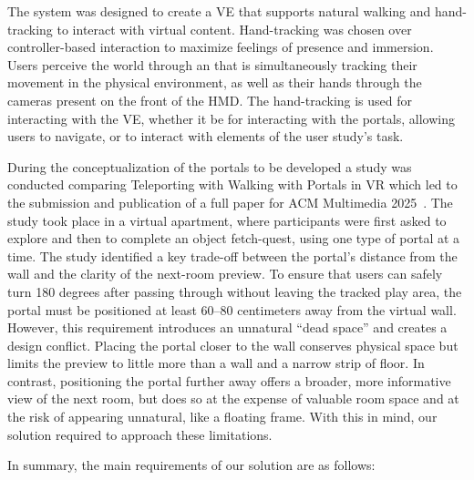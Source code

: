 The system was designed to create a \gls{VE} that supports natural walking and hand-tracking to interact with virtual content. 
Hand-tracking was chosen over controller-based interaction to maximize feelings of presence and immersion. Users 
perceive the world through an  that is simultaneously tracking their movement in the physical environment, as well as their hands 
through the cameras present on the front of the \gls{HMD}. The hand-tracking is used for interacting with the \gls{VE}, whether it be for interacting with the 
portals, allowing users to navigate, or to interact with elements of the user study's task.

During the conceptualization of the portals to be developed a study was conducted comparing Teleporting with Walking with Portals in 
\gls{VR} which led to the submission and publication of a full paper for ACM Multimedia 2025~\cite{RebeloACMM2025}.
The study took place in a virtual apartment, where participants were first asked to explore and then to complete an object fetch-quest, 
using one type of portal at a time. The study identified a key trade-off between the portal's distance from the wall and the clarity of the 
next-room preview. To ensure that users can safely turn 180 degrees after passing through without leaving the tracked play area, the portal 
must be positioned at least 60–80 centimeters away from the virtual wall. However, this requirement introduces an unnatural “dead space” and 
creates a design conflict. Placing the portal closer to the wall conserves physical space but limits the preview to little more than 
a wall and a narrow strip of floor. In contrast, positioning the portal further away offers a broader, more informative view of the next room, 
but does so at the expense of valuable room space and at the risk of appearing unnatural, like a floating frame. With this in mind, our solution 
required to approach these limitations.

In summary, the main requirements of our solution are as follows:

